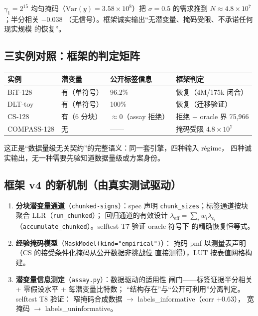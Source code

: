 \documentclass[11pt,a4paper]{ctexart}
\begin{document}
$\gamma_1=2^{15}$ 均匀掩码（$\mathrm{Var}(y)=3.58\times10^8$）把
$\sigma=0.5$ 的需求推到 $N\approx4.8\times10^7$；半分相关 $-0.038$
（无信号）。框架诚实输出``无潜变量、掩码受限、不承诺任何现实规模
的恢复''。

\subsection{三实例对照：框架的判定矩阵}

\begin{table}[htbp]\centering\small
\begin{tabular}{@{}llll@{}}
\toprule
实例 & 潜变量 & 公开标签信息 & 框架判定 \\
\midrule
BiT-128 & 有（单符号） & 96.2\% & 恢复（4M/175k 闭合） \\
DLT-toy & 有（单符号） & 100\% & 恢复（迁移验证） \\
CS-128 & 有（6 分块） & $\approx 0$（assay 拒绝） & 拒绝 + oracle 界 75,966 \\
COMPASS-128 & 无 & —— & 掩码受限 $4.8\times10^7$ \\
\bottomrule
\end{tabular}
\end{table}

这正是``数据量级无关契约''的完整语义：同一套引擎，四种输入 régime，
四种诚实输出，无一种需要先验知道数据量级或方案身份。

\subsection{框架 v4 的新机制（由真实测试驱动）}

\begin{enumerate}
  \item \textbf{分块潜变量通道}（\texttt{chunked-signs}）：spec 声明
        \texttt{chunk\_sizes}；标签通道按块聚合 LLR（\texttt{run\_chunked}）；
        回归通道的有效设计 $\lambda_{\mathrm{eff}}=\sum_i w_i\lambda_{c_i}$
        （\texttt{accumulate\_chunked}）。selftest T7 验证 oracle 符号下
        的精确恢复恒等式。
  \item \textbf{经验掩码模型}（\texttt{MaskModel(kind="empirical")}）：
        掩码 pmf 以测量表声明（CS 的接受条件化掩码从公开数据非挑战位
        直接测得），LUT 按表值网格构建。
  \item \textbf{潜变量信息测定}（\texttt{assay.py}）：数据驱动的适用性
        闸门——标签证据半分相关 + 零假设水平 + 每潜变量比特数；
        ``结构存在''与``公开可利用''分离判定。selftest T8 验证：
        窄掩码合成数据 $\to$ labels\_informative（corr $+0.63$），
        宽掩码 $\to$ labels\_uninformative。
\end{enumerate}
\end{document}
